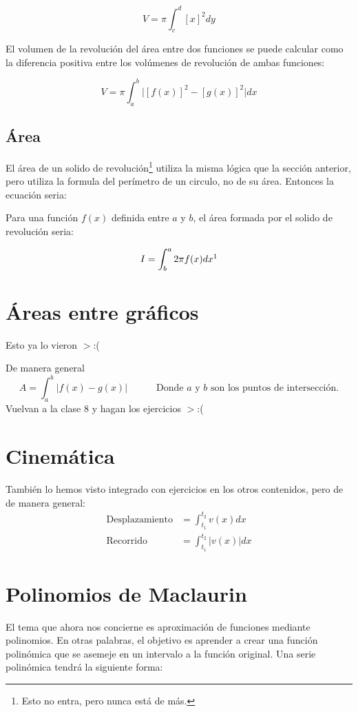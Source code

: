 \documentclass[spanish,12pt]{article}
\begin{document}
     $$V=\pi\int_c^d [x]^2dy$$
    
    
    El volumen de la revolución del área entre dos funciones se puede calcular como la diferencia positiva entre los volúmenes de revolución de ambas funciones:
    
    $$V=\pi\int_a^b \big|[f(x)]^2-[g(x)]^2\big|dx$$
\subsection{Área}
    El área de un solido de revolución\footnote{Esto no entra, pero nunca está de más.} utiliza la misma lógica que la sección anterior, pero utiliza la formula del perímetro de un circulo, no de su área. Entonces la ecuación seria:
    
    Para una función $f(x)$ definida entre $a$ y $b$, el área formada por el solido de revolución seria:
    
    $$I=\int_b^a 2\pi f(x)dx\footnotemark$$
    
\section{Áreas entre gráficos}
Esto ya lo vieron $>$:(

De manera general 
$$A=\int_a^b|f(x)-g(x)\big|\quad\quad\quad\text{Donde }a\text{ y }b\text{ son los puntos de intersección.}$$
Vuelvan a la clase 8 y hagan los ejercicios $>$:(

\section{Cinemática}

También lo hemos visto integrado con ejercicios en los otros contenidos, pero de de manera general:
\begin{align*}
    \text{Desplazamiento}&=\int_{t_1}^{t_2}v(x)dx\\
    \text{Recorrido}&=\int_{t_1}^{t_2}|v(x)|dx
\end{align*}

\section{Polinomios de Maclaurin}
El tema que ahora nos concierne es aproximación de funciones mediante polinomios. En otras palabras, el objetivo es aprender a crear una función polinómica que se asemeje en un intervalo a la función original. Una serie polinómica tendrá la siguiente forma:
\end{document}
